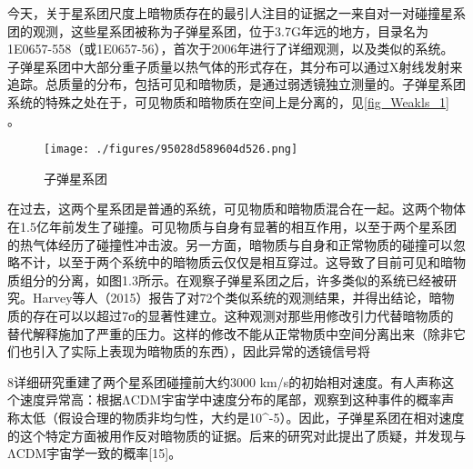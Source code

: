 

今天，关于星系团尺度上暗物质存在的最引人注目的证据之一来自对一对碰撞星系团的观测，这些星系团被称为子弹星系团，位于3.7G年远的地方，目录名为1E0657-558（或1E0657-56），首次于2006年进行了详细观测，以及类似的系统。子弹星系团中大部分重子质量以热气体的形式存在，其分布可以通过X射线发射来追踪。总质量的分布，包括可见和暗物质，是通过弱透镜独立测量的。子弹星系团系统的特殊之处在于，可见物质和暗物质在空间上是分离的，见\autoref{fig_Weakls_1} 。\begin{figure}[ht]
\centering
\texttt{[image: ./figures/95028d589604d526.png]}
\caption{子弹星系团} \label{fig_Weakls_1}
\end{figure}
在过去，这两个星系团是普通的系统，可见物质和暗物质混合在一起。这两个物体在1.5亿年前发生了碰撞。可见物质与自身有显著的相互作用，以至于两个星系团的热气体经历了碰撞性冲击波。另一方面，暗物质与自身和正常物质的碰撞可以忽略不计，以至于两个系统中的暗物质云仅仅是相互穿过。这导致了目前可见和暗物质组分的分离，如图1.3所示。在观察子弹星系团之后，许多类似的系统已经被研究。Harvey等人（2015）报告了对72个类似系统的观测结果，并得出结论，暗物质的存在可以以超过7σ的显著性建立。这种观测对那些用修改引力代替暗物质的替代解释施加了严重的压力。这样的修改不能从正常物质中空间分离出来（除非它们也引入了实际上表现为暗物质的东西），因此异常的透镜信号将

8详细研究重建了两个星系团碰撞前大约3000 km/s的初始相对速度。有人声称这个速度异常高：根据ΛCDM宇宙学中速度分布的尾部，观察到这种事件的概率声称太低（假设合理的物质非均匀性，大约是10^-5）。因此，子弹星系团在相对速度的这个特定方面被用作反对暗物质的证据。后来的研究对此提出了质疑，并发现与ΛCDM宇宙学一致的概率[15]。